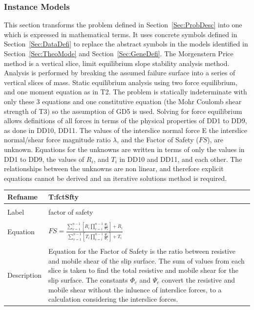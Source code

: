 \documentclass[12pt]{article}
\begin{document}
\subsubsection{Instance Models}
\label{Sec:InstMode}
This section transforms the problem defined in Section~\ref{Sec:ProbDesc} into one which is expressed in mathematical terms. It uses concrete symbols defined in Section~\ref{Sec:DataDefi} to replace the abstract symbols in the models identified in Section~\ref{Sec:TheoMode} and Section~\ref{Sec:GeneDefi}.
The Morgenstern Price method is a vertical slice, limit equilibrium slope stability analysis method. Analysis is performed by breaking the assumed failure surface into a series of vertical slices of mass. Static equilibrium analysis using two force equilibrium, and one moment equation as in T2. The problem is statically indeterminate with only these 3 equations and one constitutive equation (the Mohr Coulomb shear strength of T3) so the assumption of GD5 is used. Solving for force equilibrium allows definitions of all forces in terms of the physical properties of DD1 to DD9, as done in DD10, DD11.
The values of the interslice normal force E the interslice normal/shear force magnitude ratio $\lambda{}$, and the Factor of Safety ($FS$), are unknown. Equations for the unknowns are written in terms of only the values in DD1 to DD9, the values of $R_{i}$, and $T_{i}$ in DD10 and DD11, and each other. The relationships between the unknowns are non linear, and therefore explicit equations cannot be derived and an iterative solutions method is required.
~\newline
\noindent \begin{minipage}{\textwidth}
\begin{tabular}{p{} p{}}
\toprule \textbf{Refname} & \textbf{T:fctSfty}
\label{T:fctSfty}
\\ \midrule \\
Label & factor of safety
\\ \midrule \\
Equation & $FS=\frac{\displaystyle\sum_{v=1}^{n-1}{\left[R_{i}\displaystyle\prod_{c=i}^{n-1}{\frac{\Psi{}_{c}}{\Phi{}_{c}}}\right]}+R_{i}}{\displaystyle\sum_{v=1}^{n-1}{\left[T_{i}\displaystyle\prod_{c=i}^{n-1}{\frac{\Psi{}_{c}}{\Phi{}_{c}}}\right]}+T_{i}}$
\\ \midrule \\
Description & Equation for the Factor of Safety is the ratio between resistive and mobile shear of the slip surface. The sum of values from each slice is taken to find the total resistive and mobile shear for the slip surface. The constants $\Phi{}_{c}$ and $\Psi{}_{c}$ convert the resistive and mobile shear without the inluence of interslice forces, to a calculation considering the interslice forces.
\\ \bottomrule \end{tabular}
\end{minipage}\\
\end{document}
